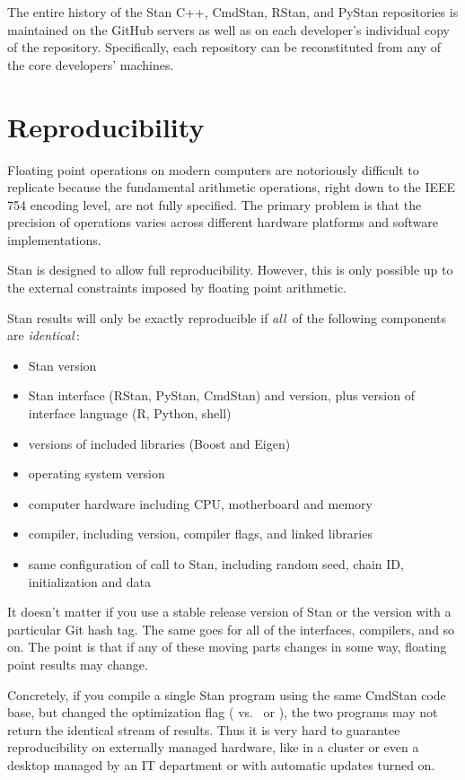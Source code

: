 The entire history of the Stan C++, CmdStan, RStan, and PyStan
repositories is maintained on the GitHub servers as well as on each
developer's individual copy of the repository. Specifically, each
repository can be reconstituted from any of the core
developers' machines.


\chapter{Reproducibility}\label{reproducibility.chapter}

\noindent
Floating point operations on modern computers are notoriously
difficult to replicate because the fundamental arithmetic operations,
right down to the IEEE 754 encoding level, are not fully specified.
The primary problem is that the precision of operations varies across
different hardware platforms and software implementations.

Stan is designed to allow full reproducibility.  However, this is only
possible up to the external constraints imposed by floating point
arithmetic.

Stan results will only be exactly reproducible if {\it all}\, of the following
components are {\it identical}\,:
%
\begin{itemize}
\item Stan version
\item Stan interface (RStan, PyStan, CmdStan) and version, plus version
  of interface language (R, Python, shell)
\item versions of included libraries (Boost and Eigen)
\item operating system version
\item computer hardware including CPU, motherboard and memory
\item \Cpp compiler, including version, compiler flags, and linked libraries
\item same configuration of call to Stan, including random seed, chain
  ID, initialization and data
\end{itemize}
%
It doesn't matter if you use a stable release version of Stan or the
version with a particular Git hash tag.  The same goes for all of the
interfaces, compilers, and so on.  The point is that if any of
these moving parts changes in some way, floating point results may
change.

Concretely, if you compile a single Stan program using the same
CmdStan code base, but changed the optimization flag ( vs.\
 or ), the two programs may not return the identical
stream of results.  Thus it is very hard to guarantee reproducibility
on externally managed hardware, like in a cluster or even a desktop
managed by an IT department or with automatic updates turned on.

